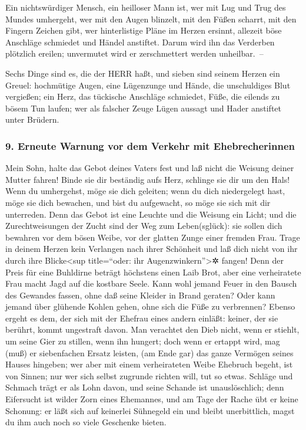 Ein nichtswürdiger Mensch, ein heilloser Mann ist, wer
mit Lug und Trug des Mundes umhergeht, wer mit den Augen
blinzelt, mit den Füßen scharrt, mit den Fingern Zeichen gibt,
wer hinterlistige Pläne im Herzen ersinnt, allezeit böse
Anschläge schmiedet und Händel anstiftet. Darum wird ihn
das Verderben plötzlich ereilen; unvermutet wird er zerschmettert werden
unheilbar.~--

Sechs Dinge sind es, die der HERR haßt, und sieben sind
seinem Herzen ein Greuel: hochmütige Augen, eine
Lügenzunge und Hände, die unschuldiges Blut vergießen;
ein Herz, das tückische Anschläge schmiedet, Füße, die
eilends zu bösem Tun laufen; wer als falscher Zeuge Lügen
aussagt und Hader anstiftet unter Brüdern.

\hypertarget{erneute-warnung-vor-dem-verkehr-mit-ehebrecherinnen}{%
\subsubsection{9. Erneute Warnung vor dem Verkehr mit
Ehebrecherinnen}\label{erneute-warnung-vor-dem-verkehr-mit-ehebrecherinnen}}

Mein Sohn, halte das Gebot deines Vaters fest und laß
nicht die Weisung deiner Mutter fahren! Binde sie dir
beständig aufs Herz, schlinge sie dir um den Hals! Wenn
du umhergehst, möge sie dich geleiten; wenn du dich niedergelegt hast,
möge sie dich bewachen, und bist du aufgewacht, so möge sie sich mit dir
unterreden. Denn das Gebot ist eine Leuchte und die
Weisung ein Licht; und die Zurechtweisungen der Zucht sind der Weg zum
Leben(sglück): sie sollen dich bewahren vor dem bösen
Weibe, vor der glatten Zunge einer fremden Frau. Trage in
deinem Herzen kein Verlangen nach ihrer Schönheit und laß dich nicht von
ihr durch ihre Blicke\textless sup title=``oder: ihr
Augenzwinkern''\textgreater✲ fangen! Denn der Preis für
eine Buhldirne beträgt höchstens einen Laib Brot, aber eine verheiratete
Frau macht Jagd auf die kostbare Seele. Kann wohl jemand
Feuer in den Bausch des Gewandes fassen, ohne daß seine Kleider in Brand
geraten? Oder kann jemand über glühende Kohlen gehen,
ohne sich die Füße zu verbrennen? Ebenso ergeht es dem,
der sich mit der Ehefrau eines andern einläßt: keiner, der sie berührt,
kommt ungestraft davon. Man verachtet den Dieb nicht,
wenn er stiehlt, um seine Gier zu stillen, wenn ihn hungert;
doch wenn er ertappt wird, mag (muß) er siebenfachen
Ersatz leisten, (am Ende gar) das ganze Vermögen seines Hauses hingeben;
wer aber mit einem verheirateten Weibe Ehebruch begeht,
ist von Sinnen; nur wer sich selbst zugrunde richten will, tut so etwas.
Schläge und Schmach trägt er als Lohn davon, und seine
Schande ist unauslöschlich; denn Eifersucht ist wilder
Zorn eines Ehemannes, und am Tage der Rache übt er keine Schonung:
er läßt sich auf keinerlei Sühnegeld ein und bleibt
unerbittlich, magst du ihm auch noch so viele Geschenke bieten.

